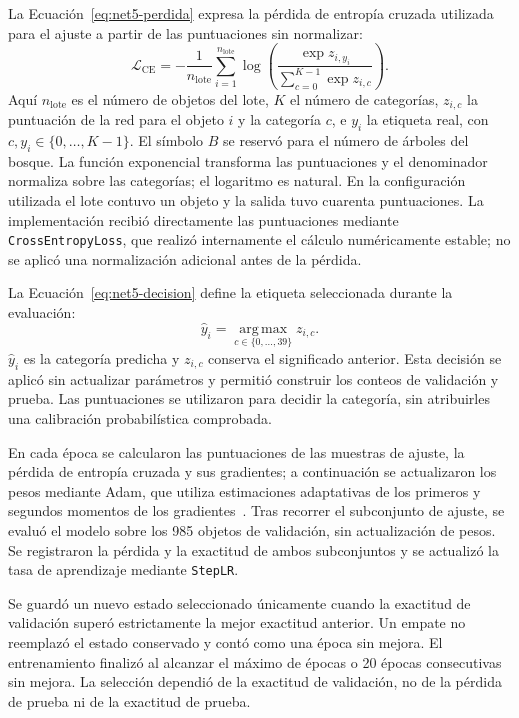 La Ecuación~\eqref{eq:net5-perdida} expresa la pérdida de entropía cruzada utilizada para el ajuste a partir de las puntuaciones sin normalizar:
\begin{equation}\label{eq:net5-perdida}
\mathcal L_{\mathrm{CE}}=-\frac{1}{n_{\mathrm{lote}}}\sum_{i=1}^{n_{\mathrm{lote}}}\log\left(\frac{\exp z_{i,y_i}}{\sum_{c=0}^{K-1}\exp z_{i,c}}\right).
\end{equation}
Aquí $n_{\mathrm{lote}}$ es el número de objetos del lote, $K$ el número de categorías, $z_{i,c}$ la puntuación de la red para el objeto $i$ y la categoría $c$, e $y_i$ la etiqueta real, con $c,y_i\in\{0,\ldots,K-1\}$. El símbolo $B$ se reservó para el número de árboles del bosque. La función exponencial transforma las puntuaciones y el denominador normaliza sobre las categorías; el logaritmo es natural. En la configuración utilizada el lote contuvo un objeto y la salida tuvo cuarenta puntuaciones. La implementación recibió directamente las puntuaciones mediante \texttt{CrossEntropyLoss}, que realizó internamente el cálculo numéricamente estable; no se aplicó una normalización adicional antes de la pérdida.

La Ecuación~\eqref{eq:net5-decision} define la etiqueta seleccionada durante la evaluación:
\begin{equation}\label{eq:net5-decision}
\widehat y_i=\operatorname*{arg\,max}_{c\in\{0,\ldots,39\}}z_{i,c}.
\end{equation}
$\widehat y_i$ es la categoría predicha y $z_{i,c}$ conserva el significado anterior. Esta decisión se aplicó sin actualizar parámetros y permitió construir los conteos de validación y prueba. Las puntuaciones se utilizaron para decidir la categoría, sin atribuirles una calibración probabilística comprobada.

En cada época se calcularon las puntuaciones de las muestras de ajuste, la pérdida de entropía cruzada y sus gradientes; a continuación se actualizaron los pesos mediante Adam, que utiliza estimaciones adaptativas de los primeros y segundos momentos de los gradientes~\parencite{kingma2015adam}. Tras recorrer el subconjunto de ajuste, se evaluó el modelo sobre los 985 objetos de validación, sin actualización de pesos. Se registraron la pérdida y la exactitud de ambos subconjuntos y se actualizó la tasa de aprendizaje mediante \texttt{StepLR}.

Se guardó un nuevo estado seleccionado únicamente cuando la exactitud de validación superó estrictamente la mejor exactitud anterior. Un empate no reemplazó el estado conservado y contó como una época sin mejora. El entrenamiento finalizó al alcanzar el máximo de épocas o 20 épocas consecutivas sin mejora. La selección dependió de la exactitud de validación, no de la pérdida de prueba ni de la exactitud de prueba.

